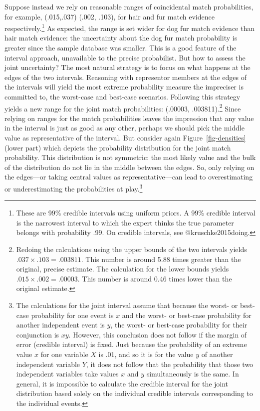 \documentclass[
  letterpaper,
  DIV=11,
  numbers=noendperiod]{scrartcl}
\begin{document}
Suppose instead we rely on reasonable ranges of coincidental match
probabilities, for example, (.015,.037) (.002, .103), for hair and fur
match evidence respectively.\footnote{These are 99\% credible intervals
  using uniform priors. A 99\% credible interval is the narrowest
  interval to which the expert thinks the true parameter belongs with
  probability .99. On credible intervals, see @kruschke2015doing.} As
expected, the range is set wider for dog fur match evidence than hair
match evidence: the uncertainty about the dog fur match probability is
greater since the sample database was smaller. This is a good feature of
the interval approach, unavailable to the precise probabilist. But how
to assess the joint uncertainty? The most natural strategy is to focus
on what happens at the edges of the two intervals. Reasoning with
representor members at the edges of the intervals will yield the most
extreme probability measure the impreciser is committed to, the
worst-case and best-case scenarios. Following this strategy yields a new
range for the joint match probabilities: (.00003, .003811).\footnote{Redoing
  the calculations using the upper bounds of the two intervals yields
  \(.037 \times .103 =.003811\). This number is around 5.88 times
  greater than the original, precise estimate. The calculation for the
  lower bounds yields \(.015 \times .002 =.00003\). This number is
  around 0.46 times lower than the original estimate.} Since relying on
ranges for the match probabilities leaves the impression that any value
in the interval is just as good as any other, perhaps we should pick the
middle value as representative of the interval. But consider again
Figure~\ref{fig-densities} (lower part) which depicts the probability
distribution for the joint match probability. This distribution is not
symmetric: the most likely value and the bulk of the distribution do not
lie in the middle between the edges. So, only relying on the edges---or
taking central values as representative---can lead to overestimating or
underestimating the probabilities at
play.\footnote{The calculations for the joint interval assume that because the worst- or best-case probability for one event is $x$ and the worst- or best-case probability for another independent event is $y$, the worst- or best-case probability for their conjunction is  $xy$. However, this conclusion does not follow if the margin of error (credible interval) is fixed. Just because the probability of an extreme value $x$ for one variable $X$ is .01, and so it is for the value $y$ of another independent variable $Y$, it does not follow that the probability that those two independent variables take values $x$ and $y$ simultaneously is the same. In general, it is impossible to calculate the credible interval for the joint distribution based solely on the individual credible intervals corresponding to the individual events.}
\end{document}
